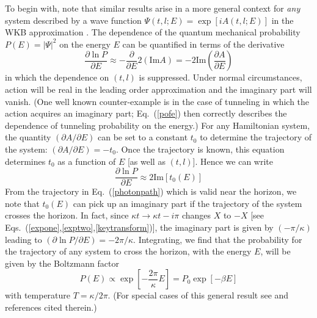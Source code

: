 \documentclass[12pt]{iopart}
\begin{document}
 
 To begin with, note that similar results arise in a more general context for \emph{any} system described by 
     a wave function $\Psi(t,l; E) = \exp[iA(t,l; E)]$ in the WKB approximation \cite{Padmanabhan:2004tz}.
      The dependence of the quantum mechanical
     probability $P(E) =|\Psi|^2$ on the energy $E$ can be quantified in terms of the derivative
     \begin{equation}
     \frac{\partial \ln P}{\partial E} \approx -\frac{\partial}{\partial E}2(\textrm{Im} A) = 
     -2 \textrm{Im} \left(\frac{\partial A}{\partial E}\right)
     \label{pofe}
     \end{equation}
     in which the dependence on $(t,l)$ is suppressed. 
     Under normal circumstances, action will be real in the leading order approximation
     and the imaginary part will vanish. (One well known counter-example is in the case of tunneling
     in which the action acquires an imaginary part; Eq.~(\ref{pofe}) then correctly describes
     the dependence of tunneling probability on the energy.)
     For any Hamiltonian system, the quantity $(\partial A/\partial E)$ can be set to a constant
     $t_0$ to determine the trajectory of the system: $(\partial A/\partial E)=-t_0$.
     Once the trajectory is known, this equation determines $t_0$ as a function of 
     $E$ [as well as $(t,l)$]. Hence we can write 
     \begin{equation}
     \frac{\partial \ln P}{\partial E} \approx 2\textrm{Im} \left[ t_0 (E)           \right]
     \label{imto}
     \end{equation}
     From the trajectory in  Eq.~(\ref{photonpath}) which is valid near the horizon,  we note that $t_0(E)$
     can pick up an imaginary part if the trajectory of the system crosses the 
     horizon. In fact, since $\kappa t \to\kappa  t-i\pi$ changes $X$ to $-X$ 
     [see Eqs.~(\ref{expone},\ref{exptwo},\ref{keytransform})], the imaginary
     part is given by $(-\pi/\kappa  )$ leading to  $(\partial \ln P/\partial E) = -2\pi/\kappa $.
     Integrating, we find that  the probability for the trajectory of any system to cross the horizon,
     with the energy $E$, will be given by the Boltzmann
     factor 
     \begin{equation}
     P(E) \propto \exp \left[- \frac{2\pi}{\kappa } E\right] = P_0\exp \left[- \beta  E\right] 
     \end{equation}
      with temperature $T=\kappa /2\pi$. (For special cases of this general result see \cite{Keski-Vakkuri:1997xp} and references
      cited therein.)
      
\end{document}
